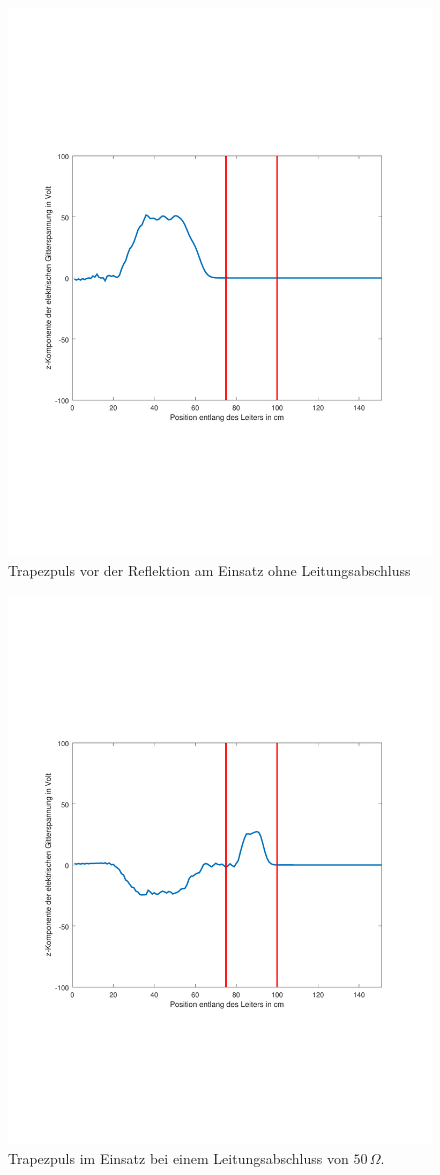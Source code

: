 \documentclass[Protokollheft.tex]{subfiles}
\begin{document}
\begin{figure}[ht]
	\centering
	\includegraphics[trim = 15mm 65mm 20mm 65mm, clip,width=0.7\linewidth]{untitledT1.pdf}
	\caption{Trapezpuls vor der Reflektion am Einsatz ohne Leitungsabschluss}\label{fig:inh1}
\end{figure} 
\begin{figure}[ht]
	\centering
	\includegraphics[trim = 15mm 65mm 20mm 65mm, clip,width=0.7\linewidth]{untitledT2.pdf}
	\caption{Trapezpuls im Einsatz bei einem Leitungsabschluss von $50\,\Omega$.}\label{fig:inh2}
\end{figure} 
\end{document}
